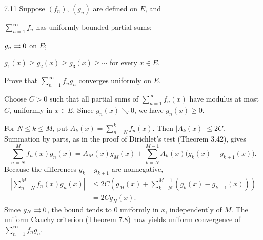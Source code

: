 \documentclass[11pt, oneside]{article}
\begin{document}
\begin{exercise}{7.11}
Suppose $(f_n)$, $(g_n)$ are defined on $E$, and
\begin{exercisesubparts}
\item $\displaystyle\sum_{n=1}^{\infty}f_n$ has uniformly bounded partial sums;
\item $g_n\rightrightarrows0$ on $E$;
\item $g_1(x)\ge g_2(x)\ge g_3(x)\ge\cdots$ for every $x\in E$.
\end{exercisesubparts}
Prove that $\displaystyle\sum_{n=1}^{\infty}f_ng_n$ converges uniformly on $E$.
\end{exercise}
\begin{solution}
Choose $C>0$ such that all partial sums of $\displaystyle\sum_{n=1}^{\infty}f_n(x)$ have modulus at most $C$, uniformly in $x\in E$. Since $g_n(x)\searrow0$, we have $g_n(x)\ge0$.

For $N\le k\le M$, put $A_k(x)=\sum_{n=N}^{k}f_n(x)$. Then $|A_k(x)|\le2C$. Summation by parts, as in the proof of Dirichlet's test (Theorem 3.42), gives
\[
 \sum_{n=N}^{M}f_n(x)g_n(x)
 =A_M(x)g_M(x)+\sum_{k=N}^{M-1}A_k(x)\bigl(g_k(x)-g_{k+1}(x)\bigr).
\]
Because the differences $g_k-g_{k+1}$ are nonnegative,
\[
 \begin{aligned}
 \left|\sum_{n=N}^{M}f_n(x)g_n(x)\right|
 &\le 2C\left(g_M(x)+\sum_{k=N}^{M-1}(g_k(x)-g_{k+1}(x))\right)\\
 &=2C g_N(x).
 \end{aligned}
\]
Since $g_N\rightrightarrows0$, the bound tends to $0$ uniformly in $x$, independently of $M$. The uniform Cauchy criterion (Theorem 7.8) now yields uniform convergence of $\displaystyle\sum_{n=1}^{\infty}f_ng_n$.
\end{solution}
\end{document}

